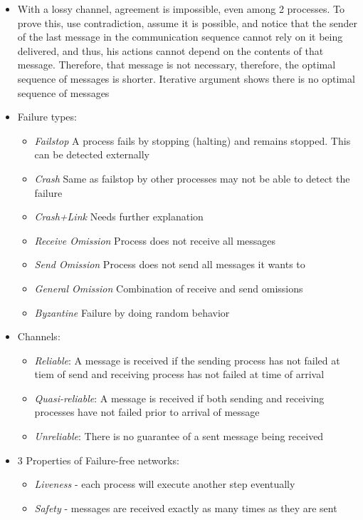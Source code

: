 \documentclass[a4paper,10pt,]{article}
\begin{document}
\begin{itemize}
  \item With a lossy channel, agreement is impossible, even among 2 processes.  To prove this, use contradiction, assume it is possible, and notice that the sender of the last message in the communication sequence cannot rely on it being delivered, and thus, his actions cannot depend on the contents of that message.  Therefore, that message is not necessary, therefore, the optimal sequence of messages is shorter.  Iterative argument shows there is no optimal sequence of messages
  \item Failure types:
  \begin{itemize}
    \item \emph{Failstop} A process fails by stopping (halting) and remains stopped.  This can be detected externally
    \item \emph{Crash} Same as failstop by other processes may not be able to detect the failure
    \item \emph{Crash+Link} Needs further explanation
    \item \emph{Receive Omission} Process does not receive all messages
    \item \emph{Send Omission} Process does not send all messages it wants to
    \item \emph{General Omission} Combination of receive and send omissions
    \item \emph{Byzantine} Failure by doing random behavior
  \end{itemize}
  \item Channels:
  \begin{itemize}
    \item \emph{Reliable}: A message is received if the sending process has not failed at tiem of send and receiving process has not failed at time of arrival
    \item \emph{Quasi-reliable}: A message is received if both sending and receiving processes have not failed prior to arrival of message
    \item \emph{Unreliable}: There is no guarantee of a sent message being received
  \end{itemize}
  \item 3 Properties of Failure-free networks:
  \begin{itemize}
    \item \emph{Liveness} - each process will execute another step eventually
    \item \emph{Safety} - messages are received exactly as many times as they are sent

\end{itemize}
\end{itemize}
\end{document}
